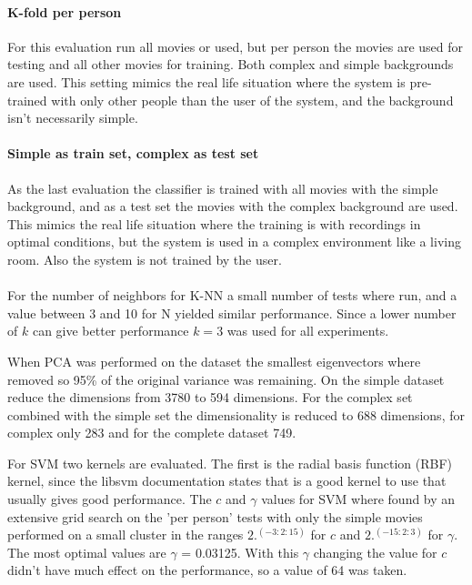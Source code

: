 \paragraph{K-fold per person}
For this evaluation run all movies or used, but per person the movies are used for testing and all other movies for training. Both complex and simple backgrounds are used. This setting mimics the real life situation where the system is pre-trained with only other people than the user of the system, and the background isn't necessarily simple. 

\paragraph{Simple as train set, complex as test set}
As the last evaluation the classifier is trained with all movies with the simple background, and as a test set the movies with the complex background are used. This mimics the real life situation where the training is with recordings in optimal conditions, but the system is used in a complex environment like a living room. Also the system is not trained by the user.

\paragraph{}
For the number of neighbors for K-NN a small number of tests where run, and a value between 3 and 10 for N yielded similar performance. Since a lower number of $k$ can give better performance $k=3$ was used for all experiments.

When PCA was performed on the dataset the smallest eigenvectors where removed so 95\% of the original variance was remaining. On the simple dataset reduce the dimensions from 3780 to 594 dimensions. For the complex set combined with the simple set the dimensionality is reduced to 688 dimensions, for complex only 283 and for the complete dataset 749.

For SVM two kernels are evaluated. The first is the radial basis function (RBF) kernel, since the libsvm documentation states that is a good kernel to use that usually gives good performance. The $c$ and $\gamma$ values for SVM where found by an extensive grid search on the 'per person' tests with only the simple movies performed on a small cluster in the ranges $2.^(-3:2:15)$ for $c$ and $2.^(-15:2:3)$ for $\gamma$. The most optimal values are $\gamma$ = 0.03125. With this $\gamma$ changing the value for $c$ didn't have much effect on the performance, so a value of 64 was taken.

